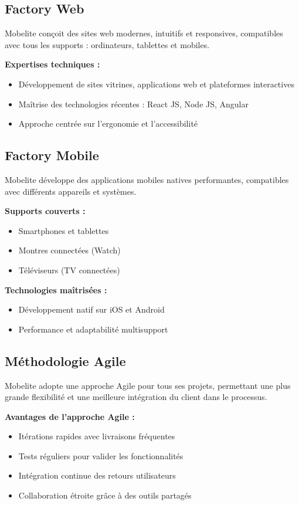 \subsection{Factory Web}

Mobelite conçoit des sites web modernes, intuitifs et responsives, compatibles avec tous les supports : ordinateurs, tablettes et mobiles.

\textbf{Expertises techniques :}
\begin{itemize}
    \item Développement de sites vitrines, applications web et plateformes interactives
    \item Maîtrise des technologies récentes : React JS, Node JS, Angular
    \item Approche centrée sur l’ergonomie et l’accessibilité
\end{itemize}

\subsection{Factory Mobile}

Mobelite développe des applications mobiles natives performantes, compatibles avec différents appareils et systèmes.

\textbf{Supports couverts :}
\begin{itemize}
    \item Smartphones et tablettes
    \item Montres connectées (Watch)
    \item Téléviseurs (TV connectées)
\end{itemize}

\textbf{Technologies maîtrisées :}
\begin{itemize}
    \item Développement natif sur iOS et Android
    \item Performance et adaptabilité multisupport
\end{itemize}

\subsection{Méthodologie Agile}

Mobelite adopte une approche Agile pour tous ses projets, permettant une plus grande flexibilité et une meilleure intégration du client dans le processus.

\textbf{Avantages de l’approche Agile :}
\begin{itemize}
    \item Itérations rapides avec livraisons fréquentes
    \item Tests réguliers pour valider les fonctionnalités
    \item Intégration continue des retours utilisateurs
    \item Collaboration étroite grâce à des outils partagés
\end{itemize}


